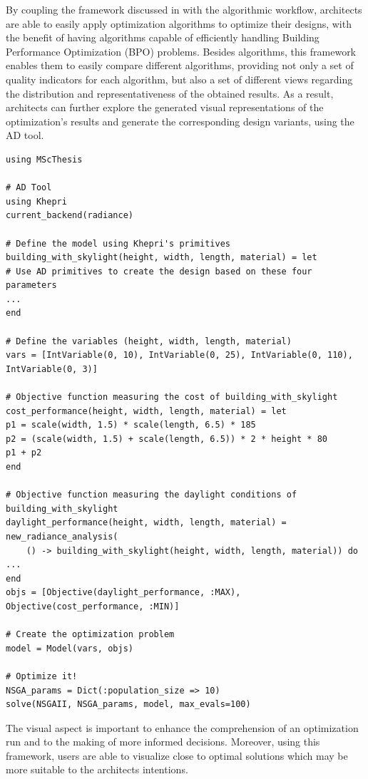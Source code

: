 By coupling the framework discussed in  with the algorithmic workflow, architects are able to easily apply optimization algorithms to optimize their designs, with the benefit of having algorithms capable of efficiently handling Building Performance Optimization (\ac{BPO}) problems. Besides algorithms, this framework enables them to easily compare different algorithms, providing not only a set of quality indicators for each algorithm, but also a set of different views regarding the distribution and representativeness of the obtained results. As a result, architects can further explore the generated visual representations of the optimization's results and generate the corresponding design variants, using the \ac{AD} tool. 


\begin{lstlisting}[caption={BPO example of the framework's API using the Khepri AD tool.},label=BPOjuliaCode]	
using MScThesis

# AD Tool
using Khepri 
current_backend(radiance)

# Define the model using Khepri's primitives
building_with_skylight(height, width, length, material) = let
# Use AD primitives to create the design based on these four parameters
...
end

# Define the variables (height, width, length, material)
vars = [IntVariable(0, 10), IntVariable(0, 25), IntVariable(0, 110), IntVariable(0, 3)]

# Objective function measuring the cost of building_with_skylight
cost_performance(height, width, length, material) = let
p1 = scale(width, 1.5) * scale(length, 6.5) * 185
p2 = (scale(width, 1.5) + scale(length, 6.5)) * 2 * height * 80
p1 + p2
end

# Objective function measuring the daylight conditions of building_with_skylight
daylight_performance(height, width, length, material) = 
new_radiance_analysis(
	() -> building_with_skylight(height, width, length, material)) do
...
end
objs = [Objective(daylight_performance, :MAX), Objective(cost_performance, :MIN)]

# Create the optimization problem
model = Model(vars, objs)

# Optimize it!
NSGA_params = Dict(:population_size => 10)
solve(NSGAII, NSGA_params, model, max_evals=100)
\end{lstlisting}


The visual aspect is important to enhance the comprehension of an optimization run and to the making of more informed decisions. Moreover, using this framework, users are able to visualize close to optimal solutions which may be more suitable to the architects intentions. 


